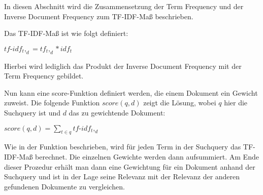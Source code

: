 In diesen Abschnitt wird die Zusammensetzung der Term Frequency und der Inverse Document Frequency zum TF-IDF-Maß beschrieben. 

\begin{defi}[TF-IDF]\label{defi:TF-IDF}
	Das TF-IDF-Maß ist wie folgt definiert:
	\begin{center}
		$tf\text{-}idf_t,_d = tf_t,_d * idf_t$
	\end{center}
	Hierbei wird lediglich das Produkt der Inverse Document Frequency mit der Term Frequency gebildet.
\end{defi}

Nun kann eine score-Funktion definiert werden, die einem Dokument ein Gewicht zuweist. Die folgende Funktion $score(q,d)$ zeigt die Lösung, wobei $q$ hier die Suchquery ist und $d$ das zu gewichtende Dokument: 
\begin{center}
	$score(q,d)=\sum\limits_{t \in q}tf\text{-}idf_t,_d$
\end{center}
\newpage
Wie in der Funktion beschrieben, wird für jeden Term in der Suchquery das TF-IDF-Maß berechnet. Die einzelnen Gewichte werden dann aufsummiert. Am Ende dieser Prozedur erhält man dann eine Gewichtung für ein Dokument anhand der Suchquery und ist in der Lage seine Relevanz mit der Relevanz der anderen gefundenen Dokumente zu vergleichen.